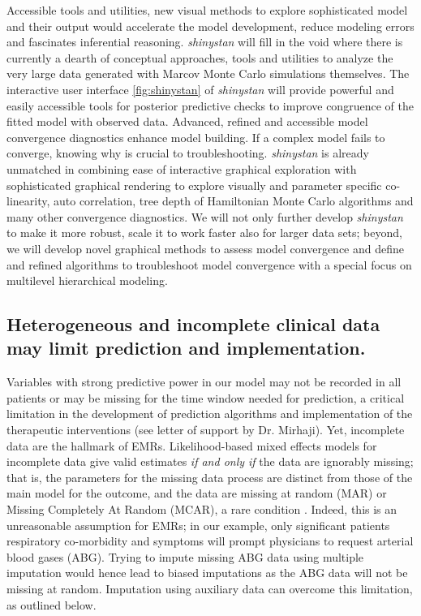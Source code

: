 \documentclass[11pt,notitlepage]{article}
\begin{document}
Accessible tools and utilities, new visual methods to explore sophisticated model and
their output would accelerate the model development, reduce modeling errors and 
fascinates inferential reasoning. \textit{shinystan} will fill in the void where 
there is currently a dearth of conceptual approaches, tools and utilities to 
analyze the very large data generated with Marcov Monte Carlo simulations 
themselves. The interactive user interface \ref{fig:shinystan} of \textit{shinystan} 
will provide powerful and easily accessible tools for posterior predictive checks 
to improve congruence of the fitted model with observed data. Advanced, refined 
and accessible model convergence diagnostics enhance model building. If a complex 
model fails to converge, knowing why is crucial to troubleshooting. \textit{shinystan} 
is already unmatched in combining ease of interactive graphical exploration 
with sophisticated graphical rendering to explore visually and parameter 
specific co-linearity, auto correlation, tree depth of Hamiltonian Monte 
Carlo algorithms and many other convergence diagnostics. We will not only 
further develop \textit{shinystan} to make it more robust, scale it to work 
faster also for larger data sets; beyond, we will develop novel graphical 
methods to assess model convergence and define and refined algorithms to 
troubleshoot model convergence with a special focus on multilevel hierarchical 
modeling. 

 

\subsection*{Heterogeneous and incomplete clinical data may limit prediction and implementation.}
Variables with strong predictive power in our model may not be recorded in all patients 
or may be missing for the time window needed for prediction, a critical limitation 
in the development of prediction algorithms and implementation of the 
therapeutic interventions (see letter of support by Dr. Mirhaji). 
Yet, incomplete data are the hallmark of EMRs. 
Likelihood-based mixed effects models for incomplete data give valid estimates 
\textit{if and only if } the data are ignorably missing; that is, the parameters 
for the missing data process are distinct from those of the main model for the 
outcome, and the data are missing at random (MAR) or Missing Completely At Random 
(MCAR), a rare condition \cite{Rubin1976}. Indeed, this is an unreasonable assumption 
for EMRs; in our example, only significant patients respiratory co-morbidity and 
symptoms will prompt physicians to request arterial blood gases (ABG). Trying to 
impute missing ABG data using multiple imputation would  hence lead to biased 
imputations as the ABG data will not be missing at random. Imputation using 
auxiliary data can overcome this limitation, as outlined below.
\end{document}
